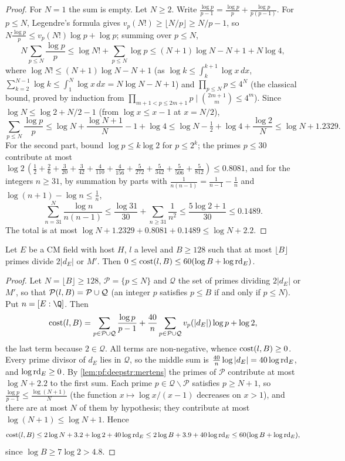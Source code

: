 \begin{proof}
For $N=1$ the sum is empty. Let $N\ge2$. Write $\frac{\log p}{p-1}=\frac{\log p}p+\frac{\log p}{p(p-1)}$.
For $p\le N$, Legendre's formula gives $v_p(N!)\ge\lfloor N/p\rfloor\ge N/p-1$, so
$N\frac{\log p}p\le v_p(N!)\log p+\log p$; summing over $p\le N$,
\[
N\sum_{p\le N}\frac{\log p}p\le\log N!+\sum_{p\le N}\log p\le(N+1)\log N-N+1+N\log4,
\]
where $\log N!\le(N+1)\log N-N+1$ (as $\log k\le\int_k^{k+1}\log x\,dx$, $\sum_{k=2}^{N-1}\log k\le\int_1^N\log x\,dx=N\log N-N+1$) and $\prod_{p\le N}p\le4^N$ (the classical bound,
proved by induction from $\prod_{m+1<p\le2m+1}p\mid\binom{2m+1}m\le4^m$). Since $\log N\le\log2+N/2-1$
(from $\log x\le x-1$ at $x=N/2$),
\[
\sum_{p\le N}\frac{\log p}p\le\log N+\frac{\log N+1}N-1+\log4\le\log N-\tfrac12+\log4+\frac{\log2}N
\le\log N+1.2329.
\]
For the second part, bound $\log p\le k\log2$ for $p\le2^k$; the primes $p\le30$ contribute at most
$\log2\,(\frac12+\frac26+\frac3{20}+\frac3{42}+\frac4{110}+\frac4{156}+\frac5{272}+\frac5{342}+\frac5{506}+\frac5{812})
\le0.8081$, and for the integers $n\ge31$, by summation by parts with $\frac1{n(n-1)}=\frac1{n-1}-\frac1n$ and
$\log(n+1)-\log n\le\frac1n$,
\[
\sum_{n=31}^N\frac{\log n}{n(n-1)}\le\frac{\log31}{30}+\sum_{n\ge31}\frac1{n^2}\le\frac{5\log2+1}{30}\le0.1489.
\]
The total is at most $\log N+1.2329+0.8081+0.1489\le\log N+2.2$.
\end{proof}

\begin{lemma}\label{lem:pf:deepstr:costbound}
Let $E$ be a CM field with host $H$, $l$ a level and $B\ge128$ such that at most $\lfloor B\rfloor$ primes divide
$2|d_E|$ or $M'$. Then $0\le\operatorname{cost}(l,B)\le60(\log B+\log\operatorname{rd}_E)$.
\end{lemma}

\begin{proof}
Let $N=\lfloor B\rfloor\ge128$, $\mathcal P=\{p\le N\}$ and $\mathcal Q$ the set of primes dividing $2|d_E|$ or
$M'$, so that $\mathcal{P}(l,B)=\mathcal P\cup\mathcal Q$ (an integer $p$ satisfies $p\le B$ if and only if
$p\le N$). Put $n=[E:\Q]$. Then
\[
\operatorname{cost}(l,B)=\sum_{p\in\mathcal P\cup\mathcal Q}\frac{\log p}{p-1}
+\frac{40}n\sum_{p\in\mathcal P\cup\mathcal Q}v_p(|d_E|)\log p+\log2,
\]
the last term because $2\in\mathcal Q$. All terms are non-negative, whence $\operatorname{cost}(l,B)\ge0$. Every prime
divisor of $d_E$ lies in $\mathcal Q$, so the middle sum is $\frac{40}n\log|d_E|=40\log\operatorname{rd}_E$, and
$\log\operatorname{rd}_E\ge0$. By \cref{lem:pf:deepstr:mertens} the primes of $\mathcal P$ contribute at most $\log N+2.2$ to
the first sum. Each prime $p\in\mathcal Q\smallsetminus\mathcal P$ satisfies $p\ge N+1$, so
$\frac{\log p}{p-1}\le\frac{\log(N+1)}N$ (the function $x\mapsto\log x/(x-1)$ decreases on $x>1$), and there are at most
$N$ of them by hypothesis; they contribute at most $\log(N+1)\le\log N+1$. Hence
\[
\operatorname{cost}(l,B)\le2\log N+3.2+\log2+40\log\operatorname{rd}_E\le2\log B+3.9+40\log\operatorname{rd}_E
\le60(\log B+\log\operatorname{rd}_E),
\]
since $\log B\ge7\log2>4.8$.
\end{proof}

